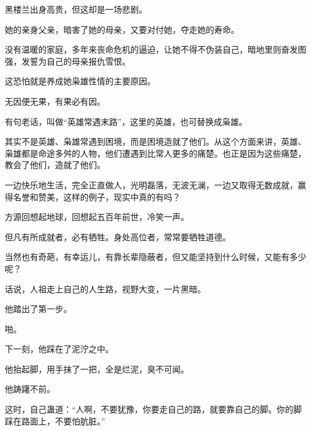 \begin{this_body}
黑楼兰出身高贵，但这却是一场悲剧。

她的亲身父亲，暗害了她的母亲，又要对付她，夺走她的寿命。

没有温暖的家庭，多年来丧命危机的逼迫，让她不得不伪装自己，暗地里则奋发图强，发誓为自己的母亲报仇雪恨。

这恐怕就是养成她枭雄性情的主要原因。

无因便无果，有果必有因。

有句老话，叫做“英雄常遇末路”，这里的英雄，也可替换成枭雄。

其实不是英雄、枭雄常遇到困境，而是困境造就了他们。从这个方面来讲，英雄、枭雄都是命途多舛的人物，他们遭遇到比常人更多的痛楚。也正是因为这些痛楚，教会了他们，造就了他们。

一边快乐地生活，完全正直做人，光明磊落，无波无澜，一边又取得无数成就，赢得名誉和赞美，这样的例子，现实中真的有吗？

方源回想起地球，回想起五百年前世，冷笑一声。

但凡有所成就者，必有牺牲。身处高位者，常常要牺牲道德。

当然也有奇葩，有幸运儿，有靠长辈隐蔽者，但又能坚持到什么时候，又能有多少呢？

话说，人祖走上自己的人生路，视野大变，一片黑暗。

他踏出了第一步。

啪。

下一刻，他踩在了泥泞之中。

他抬起脚，用手抹了一把，全是烂泥，臭不可闻。

他踌躇不前。

这时，自己蛊道：“人啊，不要犹豫，你要走自己的路，就要靠自己的脚。你的脚踩在路面上，不要怕肮脏。”

\end{this_body}

